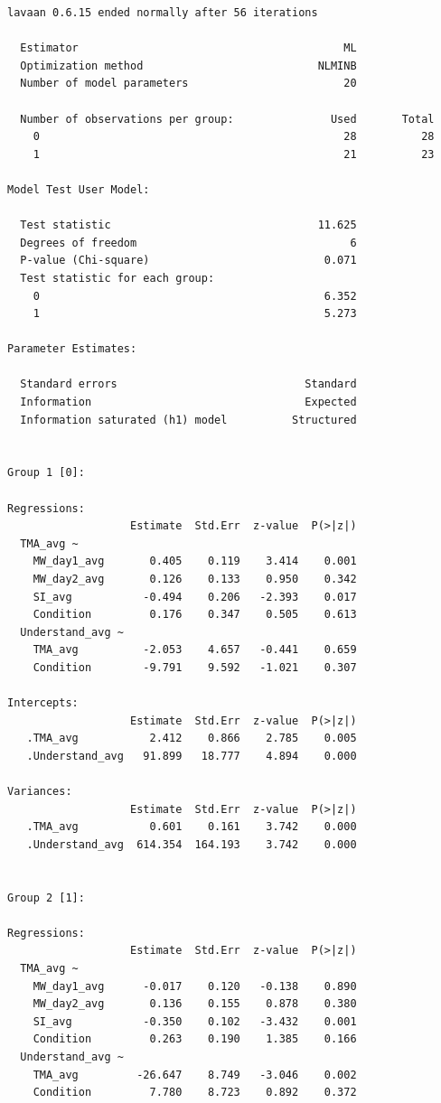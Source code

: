 \documentclass[
  letterpaper,
  DIV=11,
  numbers=noendperiod]{scrartcl}
\begin{document}
\begin{verbatim}
lavaan 0.6.15 ended normally after 56 iterations

  Estimator                                         ML
  Optimization method                           NLMINB
  Number of model parameters                        20

  Number of observations per group:               Used       Total
    0                                               28          28
    1                                               21          23

Model Test User Model:
                                                      
  Test statistic                                11.625
  Degrees of freedom                                 6
  P-value (Chi-square)                           0.071
  Test statistic for each group:
    0                                            6.352
    1                                            5.273

Parameter Estimates:

  Standard errors                             Standard
  Information                                 Expected
  Information saturated (h1) model          Structured


Group 1 [0]:

Regressions:
                   Estimate  Std.Err  z-value  P(>|z|)
  TMA_avg ~                                           
    MW_day1_avg       0.405    0.119    3.414    0.001
    MW_day2_avg       0.126    0.133    0.950    0.342
    SI_avg           -0.494    0.206   -2.393    0.017
    Condition         0.176    0.347    0.505    0.613
  Understand_avg ~                                    
    TMA_avg          -2.053    4.657   -0.441    0.659
    Condition        -9.791    9.592   -1.021    0.307

Intercepts:
                   Estimate  Std.Err  z-value  P(>|z|)
   .TMA_avg           2.412    0.866    2.785    0.005
   .Understand_avg   91.899   18.777    4.894    0.000

Variances:
                   Estimate  Std.Err  z-value  P(>|z|)
   .TMA_avg           0.601    0.161    3.742    0.000
   .Understand_avg  614.354  164.193    3.742    0.000


Group 2 [1]:

Regressions:
                   Estimate  Std.Err  z-value  P(>|z|)
  TMA_avg ~                                           
    MW_day1_avg      -0.017    0.120   -0.138    0.890
    MW_day2_avg       0.136    0.155    0.878    0.380
    SI_avg           -0.350    0.102   -3.432    0.001
    Condition         0.263    0.190    1.385    0.166
  Understand_avg ~                                    
    TMA_avg         -26.647    8.749   -3.046    0.002
    Condition         7.780    8.723    0.892    0.372


\end{verbatim}
\end{document}

